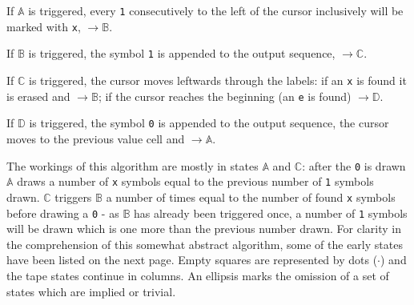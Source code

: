 \documentclass[Master.tex]{subfiles}
\begin{document}
If $\mathbb{A}$ is triggered, every \texttt{1} consecutively to the left of the cursor inclusively will be marked with \texttt{x}, $\rightarrow \mathbb{B}$.

If $\mathbb{B}$ is triggered, the symbol \texttt{1} is appended to the output sequence, $\rightarrow \mathbb{C}$.

If $\mathbb{C}$ is triggered, the cursor moves leftwards through the labels: if an \texttt{x} is found it is erased and $\rightarrow \mathbb{B}$; if the cursor reaches the beginning (an \texttt{e} is found) $\rightarrow \mathbb{D}$.

If $\mathbb{D}$ is triggered, the symbol \texttt{0} is appended to the output sequence, the cursor moves to the previous value cell and $\rightarrow \mathbb{A}$.

The workings of this algorithm are mostly in states $\mathbb{A}$ and $\mathbb{C}$: after the \texttt{0} is drawn $\mathbb{A}$ draws a number of \texttt{x} symbols equal to the previous number of \texttt{1} symbols drawn. $\mathbb{C}$ triggers $\mathbb{B}$ a number of times equal to the number of found \texttt{x} symbols before drawing a \texttt{0} - as $\mathbb{B}$ has already been triggered once, a number of \texttt{1} symbols will be drawn which is one more than the previous number drawn. For clarity in the comprehension of this somewhat abstract algorithm, some of the early states have been listed on the next page. Empty squares are represented by dots ($\cdot$) and the tape states continue in columns. An ellipsis marks the omission of a set of states which are implied or trivial.
\end{document}
